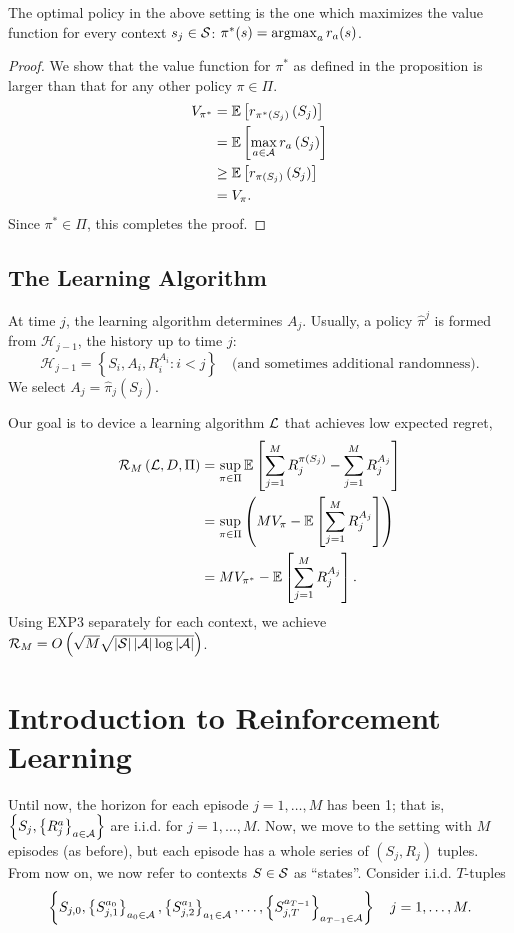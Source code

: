 \documentclass[11pt]{article}
\begin{document}
\begin{proposition}
	The optimal policy in the above setting is the one which maximizes the value function for every context $s_{j} \in \mathcal{S}$: $\pi^{*}(s) = \operatorname*{argmax}_{a} r_{a}(s)$. 
\end{proposition}
\begin{proof}
	We show that the value function for $\pi^{*}$ as defined in the proposition is larger than that for any other policy $\pi \in \Pi$. 
	\begin{align*}
		V_{\pi^*} &= \mathbb{E}\left[r_{\pi^{*}\left(S_{j}\right)}\left(S_{j}\right)\right] \\
		&= \mathbb{E}\left[\max_{a\in\mathcal{A}} r_{a}\left(S_{j}\right)\right] \\
		&\geq \mathbb{E}\left[r_{\pi\left(S_{j}\right)}\left(S_{j}\right)\right] \\
		&= V_{\pi}.
	\end{align*}
	Since $\pi^{*}\in\Pi$, this completes the proof.
\end{proof}

\subsection{The Learning Algorithm}
At time $j$, the learning algorithm determines $A_{j}$. Usually, a policy $\hat{\pi}^{j}$ is formed from $\mathcal{H}_{j-1}$, the history up to time $j$:
\[
	\mathcal{H}_{j-1} = \left\{S_{i}, A_{i}, R_{i}^{A_{i}} : i<j \right\} \quad \text{(and sometimes additional randomness)}.
\]
We select $A_{j} = \hat{\pi}_{j}\left(S_{j}\right)$. 

Our goal is to device a learning algorithm $\mathcal{L}$ that achieves low expected regret,
\begin{align*}
	\mathcal{R}_{M}\left(\mathcal{L}, D, \Pi\right) &= \sup_{\pi \in \Pi} \mathbb{E}\left[\sum_{j=1}^{M} R_{j}^{\pi\left(S_{j}\right)} - \sum_{j=1}^{M} R_{j}^{A_{j}}\right] \\
	&= \sup_{\pi\in\Pi} \left(MV_{\pi} - \mathbb{E}\left[\sum_{j=1}^{M} R_{j}^{A_{j}}\right]\right) \\
	&= MV_{\pi^{*}} - \mathbb{E}\left[\sum_{j=1}^{M} R_{j}^{A_{j}}\right].
\end{align*}
Using EXP3 separately for each context, we achieve $\mathcal{R}_{M} = O\left(\sqrt{M} \sqrt{\left|\mathcal{S}\right| \left|\mathcal{A}\right| \log\left|\mathcal{A}\right|}\right)$.

\section{Introduction to Reinforcement Learning}
Until now, the horizon for each episode $j=1,\ldots,M$ has been 1; that is, $\left\{S_{j}, \left\{R_{j}^{a}\right\}_{a\in\mathcal{A}}\right\}$ are i.i.d. for $j=1,\ldots,M$. Now, we move to the setting with $M$ episodes (as before), but each episode has a whole series of $(S_{j}, R_{j})$ tuples. From now on, we now refer to contexts $S\in\mathcal{S}$ as ``states''. Consider i.i.d. $T$-tuples
\[
	\left\{S_{j,0}, \left\{S_{j,1}^{a_{0}}\right\}_{a_{0} \in \mathcal{A}}, \left\{S_{j,2}^{a_{1}}\right\}_{a_{1} \in \mathcal{A}}, \ldots, \left\{S_{j,T}^{a_{T-1}}\right\}_{a_{T-1} \in \mathcal{A}}\right\} \quad j=1,\ldots,M.
\]
\end{document}

